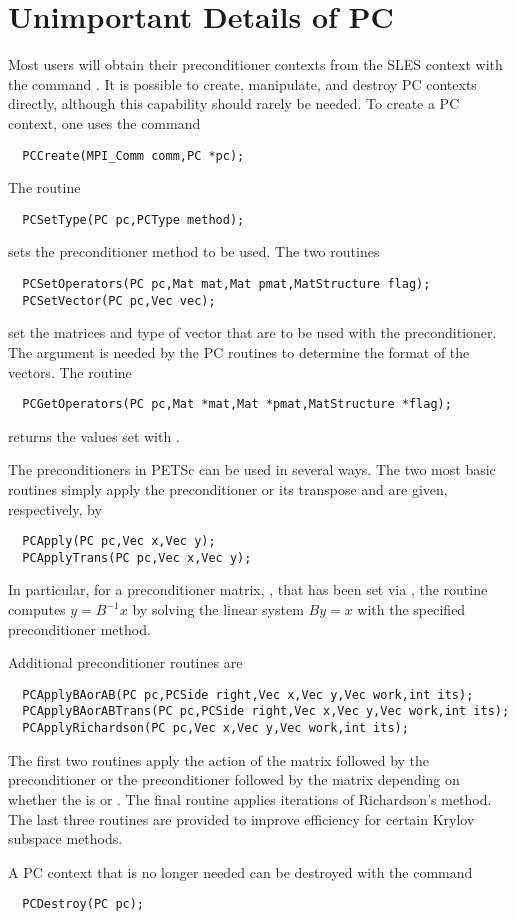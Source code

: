 \section{Unimportant Details of PC}

Most users will obtain their preconditioner contexts from the SLES
context with the command . It is possible to create,
manipulate, and destroy PC contexts directly, although this capability
should rarely be needed. To create a PC context, one uses the command
\begin{verbatim}
  PCCreate(MPI_Comm comm,PC *pc);
\end{verbatim}
The routine 
\begin{verbatim}
  PCSetType(PC pc,PCType method);
\end{verbatim}
sets the preconditioner method to be used. 
The two routines  
\begin{verbatim}
  PCSetOperators(PC pc,Mat mat,Mat pmat,MatStructure flag);
  PCSetVector(PC pc,Vec vec);
\end{verbatim}
set the matrices and type of vector that are to be used with 
the preconditioner.  The  argument is needed by the PC routines 
to determine the format of the vectors. 
The routine 
\begin{verbatim}
  PCGetOperators(PC pc,Mat *mat,Mat *pmat,MatStructure *flag);
\end{verbatim}
returns the values set with .

  
The preconditioners in PETSc can be used in several ways.  The two
most basic routines simply apply the preconditioner or its transpose
and are given, respectively, by
\begin{verbatim}
  PCApply(PC pc,Vec x,Vec y);
  PCApplyTrans(PC pc,Vec x,Vec y);
\end{verbatim}
In particular, for a preconditioner matrix, , that has
been set via ,
the routine  computes $y = B^{-1} x$
by solving the linear system $By = x$ with the specified preconditioner
method.

 
Additional preconditioner routines are
\begin{verbatim}
  PCApplyBAorAB(PC pc,PCSide right,Vec x,Vec y,Vec work,int its);
  PCApplyBAorABTrans(PC pc,PCSide right,Vec x,Vec y,Vec work,int its);
  PCApplyRichardson(PC pc,Vec x,Vec y,Vec work,int its);
\end{verbatim}
The first two routines apply the action of the matrix followed by the
preconditioner or the preconditioner followed by the matrix depending
on whether the   is
 or . The final routine applies  iterations of
Richardson's method.   
The last three routines are provided to improve
efficiency for certain Krylov subspace methods.

A PC context that is no longer needed can be destroyed with the 
command 
\begin{verbatim}
  PCDestroy(PC pc);
\end{verbatim}

